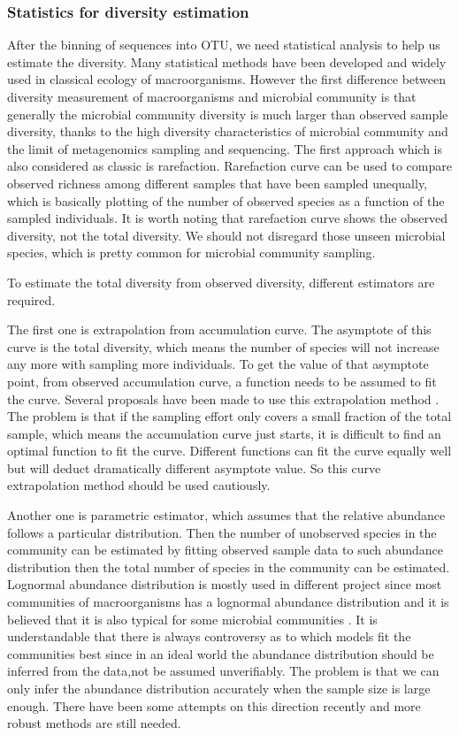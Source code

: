 \subsubsection{Statistics for diversity estimation} After the binning of
sequences into OTU, we need statistical analysis to help us estimate the diversity. Many
statistical methods have been developed and widely used in classical ecology of
macroorganisms. However the first difference between diversity measurement of
macroorganisms and microbial community is that generally the microbial
community diversity is much larger than observed sample diversity, thanks to
the high diversity characteristics of microbial community and the limit of
metagenomics sampling and sequencing. The first approach which is also
considered as classic is rarefaction. Rarefaction curve can be used to compare
observed richness among different samples that have been sampled unequally,
which is basically plotting of the number of observed species as a function of
the sampled individuals. It is worth noting that rarefaction curve shows the
observed diversity, not the total diversity. We should not disregard those
unseen microbial species, which is pretty common for microbial community
sampling.

To estimate the total diversity from observed diversity, different estimators
are required.

The first one is extrapolation from accumulation curve. The asymptote of this
curve is the total diversity, which means the number of species will not
increase any more with sampling more individuals. To get the value of that
asymptote point, from observed accumulation curve, a function needs to be
assumed to fit the curve. Several proposals have been made to use this
extrapolation method \cite{colwell2004interpolating, gotelli2001quantifying}.
The problem is that if the sampling effort only covers a small fraction of the
total sample, which means the accumulation curve just starts, it is difficult
to find an optimal function to fit the curve. Different functions can fit the
curve equally well but will deduct dramatically different asymptote value. So
this curve extrapolation method should be used cautiously.

Another one is parametric estimator, which assumes that the relative abundance
follows a particular distribution. Then the number of unobserved species in the
community can be estimated by fitting observed sample data to such abundance
distribution then the total number of species in the community can be
estimated. Lognormal abundance distribution is mostly used in different project
since most communities of macroorganisms has a lognormal abundance distribution
and it is believed that it is also typical for some microbial communities
\cite{Curtis:2002aa, Schloss:2006aa, Quince:2008aa}. It is understandable that
there is always controversy as to which models fit the communities best since
in an ideal world the abundance distribution should be inferred from the
data,not be assumed unverifiably. The problem is that we can only infer the
abundance distribution accurately when the sample size is large enough. There
have been some attempts on this direction recently \cite{Gans:2005aa} and more
robust methods are still needed.

